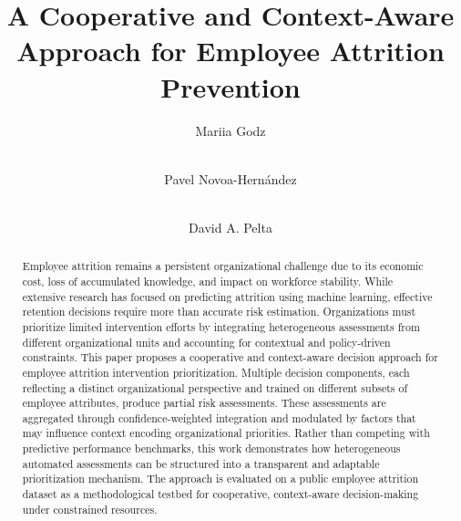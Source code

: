 \documentclass[runningheads]{llncs}
\begin{document}
%

\title{A Cooperative and Context-Aware Approach for Employee Attrition Prevention}

%
\author{
Mariia Godz \and \\
Pavel Novoa-Hern\'andez \and \\
David A. Pelta
}


%
%

%
\maketitle              %
%
\begin{abstract}
Employee attrition remains a persistent organizational challenge due to its economic cost, loss of accumulated knowledge, and impact on workforce stability.
While extensive research has focused on predicting attrition using machine learning, effective retention decisions require more than accurate risk estimation.
Organizations must prioritize limited intervention efforts by integrating heterogeneous assessments from different organizational units and accounting for contextual and policy-driven constraints.
This paper proposes a cooperative and context-aware decision approach for employee attrition intervention prioritization.
Multiple decision components, each reflecting a distinct organizational perspective and trained on different subsets of employee attributes, produce partial risk assessments.
These assessments are aggregated through confidence-weighted integration and modulated by factors that may influence context encoding organizational priorities.
Rather than competing with predictive performance benchmarks, this work demonstrates how heterogeneous automated assessments can be structured into a transparent and adaptable prioritization mechanism.
The approach is evaluated on a public employee attrition dataset as a methodological testbed for cooperative, context-aware decision-making under constrained resources.

\end{abstract}
\end{document}
